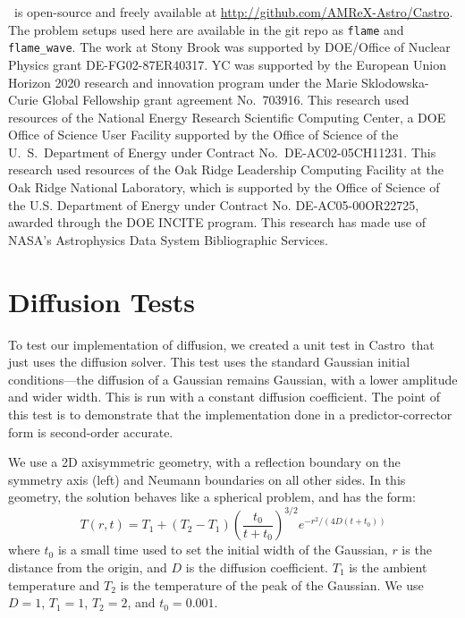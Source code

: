 \documentclass[preprint,times,tighten]{aastex63}
\newcommand{\castro}{{\sf Castro}}
\begin{document}


\acknowledgements \castro\ is open-source and freely available at
\url{http://github.com/AMReX-Astro/Castro}.  The problem setups used
here are available in the git repo as {\tt flame} and {\tt
  flame\_wave}.  The work at Stony Brook was supported by DOE/Office
of Nuclear Physics grant DE-FG02-87ER40317.  YC was supported by the
European Union Horizon 2020 research and innovation program under
the Marie Sklodowska-Curie Global Fellowship grant agreement No.\
703916.  This research used resources of the National Energy Research
Scientific Computing Center, a DOE Office of Science User Facility
supported by the Office of Science of the U.~S.\ Department of Energy
under Contract No.\ DE-AC02-05CH11231.  This research used resources
of the Oak Ridge Leadership Computing Facility at the Oak Ridge
National Laboratory, which is supported by the Office of Science of
the U.S. Department of Energy under Contract No. DE-AC05-00OR22725,
awarded through the DOE INCITE program.  This research has made use of
NASA's Astrophysics Data System Bibliographic Services.






\appendix

\section{Diffusion Tests}
\label{app:diffusion}

To test our implementation of diffusion, we created a unit test in
\castro\ that just uses the diffusion solver.  This test uses the
standard Gaussian initial conditions---the diffusion of a Gaussian
remains Gaussian, with a lower amplitude and wider width.  This is run
with a constant diffusion coefficient. The point of this test is to
demonstrate that the implementation done in a predictor-corrector
form is second-order accurate.

We use a 2D axisymmetric geometry, with a reflection boundary on the symmetry axis (left)
and Neumann boundaries on all other sides.  In this geometry, the solution behaves like
a spherical problem, and has the form:
\begin{equation}
  T(r,t) = T_1 + (T_2 - T_1) \left (\frac{t_0}{t + t_0} \right )^{3/2} e^{-r^2/(4 D (t + t_0))}
\end{equation}
where $t_0$ is a small time used to set the initial width of the
Gaussian, $r$ is the distance from the origin, and $D$ is the
diffusion coefficient.  $T_1$ is the ambient temperature and $T_2$ is
the temperature of the peak of the Gaussian.  We use $D = 1$, $T_1 = 1$, $T_2 = 2$,
and $t_0 = 0.001$.
\end{document}
